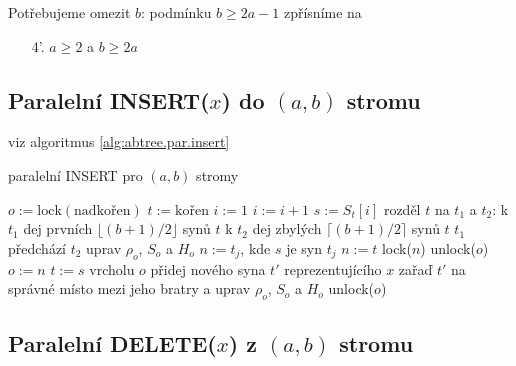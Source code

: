 Potřebujeme omezit $b$: podmínku $b \geq 2a - 1$ zpřísníme na
\begin{enumerate}
\item[4'.] $a \geq 2$ a $b \geq 2a$ 
\end{enumerate}

\subsection{Paralelní INSERT($x$) do $(a,b)$ stromu}

viz algoritmus \ref{alg:abtree.par.insert}

\begin{algorithm}[!htb]
\caption{paralelní INSERT pro $(a,b)$ stromy}
\label{alg:abtree.par.insert}
\begin{algorithmic}
\STATE $o := \text{lock}(\text{nadkořen})$ 
\STATE $t := \text{kořen}$ 
\STATE {}
	\STATE $i := 1$
		\STATE $i := i + 1$
	\ENDWHILE
	\STATE $s := S_t[i]$ 
	\STATE {}
		\STATE rozděl $t$ na $t_1$ a $t_2$: 
		\STATE \quad k $t_1$ dej prvních 
			$\lfloor (b+1)/2 \rfloor$ synů $t$
		\STATE \quad k $t_2$ dej zbylých 
			$\lceil (b+1)/2 \rceil$ synů $t$
		\STATE \quad $t_1$ předchází $t_2$
		\STATE uprav $\rho_o$, $S_o$ a $H_o$
		\STATE {}
		\STATE {}
		\STATE $n := t_j$, kde $s$ je syn $t_j$
	\ELSE
		\STATE $n := t$
	\ENDIF
	\STATE lock($n$) 
	\STATE unlock($o$) 
	\STATE $o := n$
	\STATE $t := s$
\ENDWHILE
{}
	\STATE vrcholu $o$ přidej nového syna $t'$ 
	reprezentujícího $x$
	\STATE zařaď $t'$ na správné místo mezi jeho bratry
	a uprav $\rho_o$, $S_o$ a $H_o$
\ENDIF
\STATE unlock($o$)
\end{algorithmic}
\end{algorithm}

\subsection{Paralelní DELETE($x$) z $(a,b)$ stromu}

